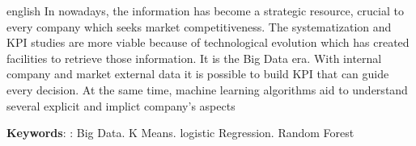 \begin{resumo}[Abstract]
 \begin{otherlanguage*}{english}
In nowadays, the information has become a strategic resource, crucial to every company which seeks market competitiveness. The systematization and KPI studies are more viable because of technological evolution which has created facilities to retrieve those information. It is the Big Data era. With internal company and market external data it is possible to build KPI that can guide every decision. At the same time, machine learning algorithms aid to understand several explicit and implict company's aspects 

   \vspace{\onelineskip}
 
   \noindent 
   \textbf{Keywords}: : Big Data. K Means. logistic Regression. Random Forest
 \end{otherlanguage*}
\end{resumo}